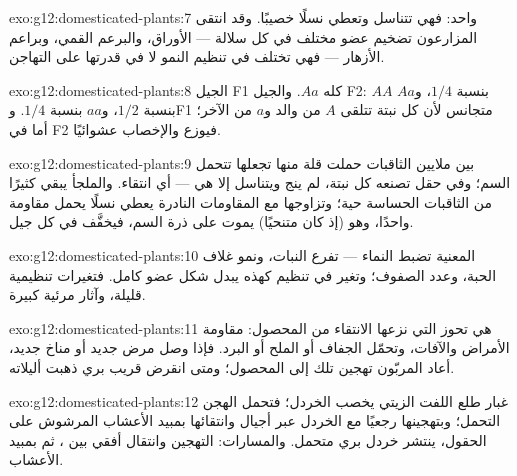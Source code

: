 \begin{solution}{exo:g12:domesticated-plants:7}
 واحد: فهي تتناسل وتعطي نسلًا خصيبًا. وقد انتقى المزارعون تضخيم عضو
مختلف في كل سلالة --- الأوراق، والبرعم القمي، وبراعم الأزهار --- فهي
تختلف في تنظيم النمو لا في قدرتها على التهاجن.
\end{solution}

\begin{solution}{exo:g12:domesticated-plants:8}
الجيل F1 كله $Aa$. والجيل F2: $AA$ بنسبة $1/4$، و$Aa$ بنسبة $1/2$،
و$aa$ بنسبة $1/4$. وF1 متجانس لأن كل نبتة تتلقى $A$ من والد و$a$ من
الآخر؛ أما في F2 فيوزع  والإخصاب  عشوائيًا.
\end{solution}

\begin{solution}{exo:g12:domesticated-plants:9}
بين ملايين الثاقبات حملت قلة منها  تجعلها تتحمل السم؛ وفي حقل تصنعه
كل نبتة، لم ينج ويتناسل إلا هي --- أي انتقاء. والملجأ يبقي كثيرًا من
الثاقبات الحساسة حية؛ وتزاوجها مع المقاومات النادرة يعطي نسلًا يحمل
 مقاومة واحدًا، وهو (إذ كان متنحيًا) يموت على ذرة السم، فيخفَّف
 في كل جيل.
\end{solution}

\begin{solution}{exo:g12:domesticated-plants:10}
 المعنية تضبط النماء --- تفرع النبات، ونمو غلاف الحبة، وعدد
الصفوف؛ وتغير في تنظيم  كهذه يبدل شكل عضو كامل. فتغيرات تنظيمية
قليلة، وآثار مرئية كبيرة.
\end{solution}

\begin{solution}{exo:g12:domesticated-plants:11}
هي تحوز  التي نزعها الانتقاء من المحصول: مقاومة الأمراض
والآفات، وتحمّل الجفاف أو الملح أو البرد. فإذا وصل مرض جديد أو مناخ
جديد، أعاد المربّون تهجين تلك  إلى المحصول؛ ومتى انقرض قريب
بري ذهبت أليلاته.
\end{solution}

\begin{solution}{exo:g12:domesticated-plants:12}
غبار طلع اللفت الزيتي يخصب الخردل؛ فتحمل الهجن  التحمل؛ وبتهجينها
رجعيًا مع الخردل عبر أجيال وانتقائها بمبيد الأعشاب المرشوش على الحقول،
ينتشر خردل بري متحمل. والمسارات: التهجين وانتقال أفقي  بين
، ثم  بمبيد الأعشاب.
\end{solution}

